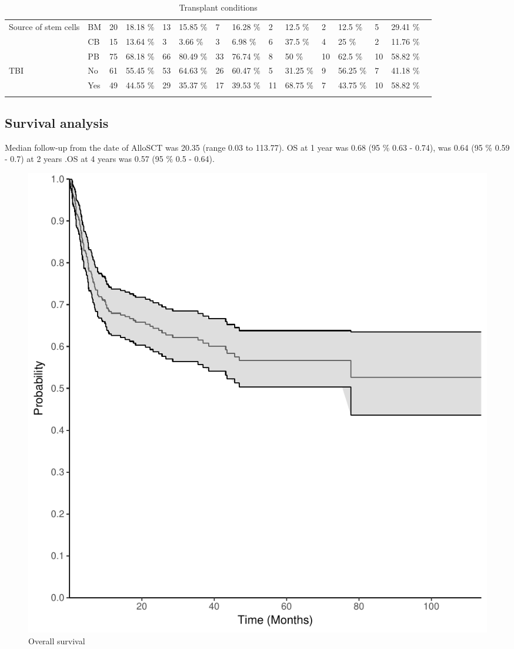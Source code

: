 \documentclass[a4paper,11pt] {article}
\begin{document}
\begin{landscape}
\begin{longtable}{lllllllllllllll}
  Source of stem cells & BM & 20 & 18.18 \% & 13 & 15.85 \% & 7 & 16.28 \% & 2 & 12.5 \% & 2 & 12.5 \% & 5 & 29.41 \% &  \\ 
   & CB & 15 & 13.64 \% & 3 & 3.66 \% & 3 & 6.98 \% & 6 & 37.5 \% & 4 & 25 \% & 2 & 11.76 \% &  \\ 
   & PB & 75 & 68.18 \% & 66 & 80.49 \% & 33 & 76.74 \% & 8 & 50 \% & 10 & 62.5 \% & 10 & 58.82 \% &  \\ 
  TBI & No & 61 & 55.45 \% & 53 & 64.63 \% & 26 & 60.47 \% & 5 & 31.25 \% & 9 & 56.25 \% & 7 & 41.18 \% &  \\ 
   & Yes & 49 & 44.55 \% & 29 & 35.37 \% & 17 & 39.53 \% & 11 & 68.75 \% & 7 & 43.75 \% & 10 & 58.82 \% &  \\ 
   \hline
\hline
\caption{Transplant conditions} 
\label{tab:tra}
\end{longtable}
\end{landscape}

\restoregeometry

\subsection{Survival analysis}
Median follow-up from the date of AlloSCT was 20.35 (range 0.03 to 113.77). OS at 1 year was 0.68 (95 \% 0.63 - 0.74), was 0.64 (95 \% 0.59 - 0.7) at 2 years
.OS at 4 years was 0.57 (95 \% 0.5 - 0.64).
\begin{figure}[h]
\begin{center}
\includegraphics{Rapport-fig1}
\end{center}
\caption{Overall survival}
\label{fig1}
\end{figure}
\end{document}
